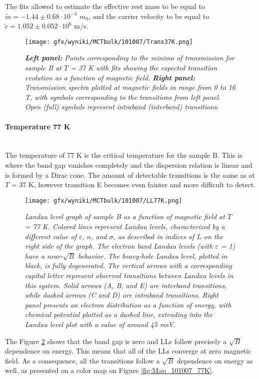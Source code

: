 \documentclass[titlepage,a4paper]{book}
\newcommand{\wciecie}{\quad\phantom{v}}
\newcommand{\myparagraph}[1]{\paragraph{#1}\mbox{}\\}
\begin{document}
The fits allowed to estimate the effective rest mass to be equal to $\tilde m = -1.44 \pm 0.68 \cdot 10^{-3}$ $m_0$, and the carrier velocity to be equal to $\tilde{c} = 1.052 \pm 0.052 \cdot 10^6$ m/s.

\begin{figure}[H]
	\centering
	\texttt{[image: gfx/wyniki/MCTbulk/101007/Trans37K.png]}
	\vspace{-10pt}
	\caption{\textit{\textbf{Left panel:} Points corresponding to the minima of transmission for sample B at $T$ = 37 K with fits showing the expected transition evolution as a function of magnetic field. \textbf{Right panel:} Transmission spectra plotted at magnetic fields in range from 0 to 16 T, with symbols corresponding to the transitions from left panel. Open (full) symbols represent intraband (interband) transitions.}}
	\label{fig:Spectra_101007_37K}
\end{figure}  

\myparagraph{Temperature 77 K}
\wciecie
The temperature of 77 K is the critical temperature for the sample B. This is where the band gap vanishes completely and the dispersion relation is linear and is formed by a Dirac cone. The amount of detectable transitions is the same as at $T$ = 37 K, however transition E becomes even fainter and more difficult to detect. 
\begin{figure}[ht]
	\centering
	\texttt{[image: gfx/wyniki/MCTbulk/101007/LL77K.png]}
	\vspace{-10pt}
	\caption{\textit{Landau level graph of sample B as a function of magnetic field at $T$ = 77 K. Colored lines represent Landau levels, characterized by a different value of $\varepsilon$, $n$, and $\sigma$, as described in indices of $L$ on the right side of the graph. The electron band Landau levels (with $\varepsilon$ = 1) have a near-$\sqrt{B}$ behavior. The heavy-hole Landau level, plotted in black, is fully degenerated. The vertical arrows with a corresponding capital letter represent observed transitions between Landau levels in this system. Solid arrows (A, B, and E) are interband transitions, while dashed arrows (C and D) are intraband transitions. Right panel presents an electron distribution as a function of energy, with chemical potential plotted as a dashed line, extending into the Landau level plot with a value of around 45 meV.}}
	\label{fig:LL_101007_77K}
\end{figure}

The Figure \ref{fig:LL_101007_77K} shows that the band gap is zero and LLs follow precisely a $\sqrt{B}$ dependence on energy. This means that all of the LLs converge at zero magnetic field. As a consequence, all the transitions follow a $\sqrt{B}$ dependence on energy as well, as presented on a color map on Figure \ref{fig:Map_101007_77K}. 
\end{document}
